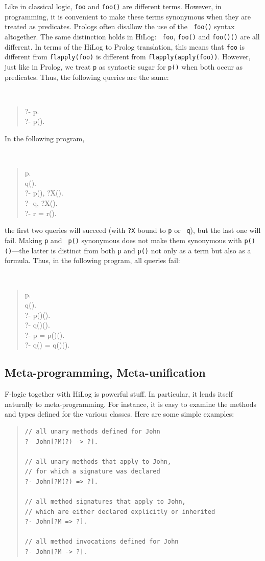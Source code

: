 \documentclass[11pt]{article}
\newcommand{\fl}{\mbox{F-logic}\xspace}
\begin{document}
%
Like in classical logic, {\tt foo} and {\tt foo()} are different terms.
However, in programming, it is convenient to make these terms synonymous
when they
are treated as predicates. Prologs often disallow the use of the {\tt
  foo()} syntax altogether.  The same distinction holds in HiLog: {\tt
  foo}, {\tt foo()} and {\tt foo()()} are all different. In terms of the
HiLog to Prolog translation, this means that {\tt foo} is different from
{\tt flapply(foo)} is different from {\tt flapply(apply(foo))}.  However, just
like in Prolog, we treat {\tt p} as syntactic sugar for {\tt p()} when both
occur as predicates. Thus, the following queries are the same:
{\tt
\begin{quote}
  ?- p.\\
  ?- p().
\end{quote}
}
\noindent
In the following program,
{\tt
\begin{quote}
 p. \\
 q().\\
 ?- p(), ?X().\\
 ?- q, ?X().\\
 ?- r = r().
\end{quote}
}
\noindent
the first two queries will succeed (with {\tt ?X} bound to {\tt p} or {\tt
  q}), but the last one will fail.  Making {\tt p} and {\tt
  p()} synonymous does not make them synonymous with {\tt p()()}---the
latter is distinct from both {\tt p}
and {\tt p()} not only as a term but also as a formula. Thus, in the following
program, all queries fail:
{\tt
\begin{quote}
 p.\\
 q().\\
 ?- p()().\\
 ?- q()().\\
 ?- p = p()().\\
 ?- q() = q()().
\end{quote}
}


\subsection{Meta-programming, Meta-unification}
\label{sec-meta-reification}


%
\fl together with HiLog is powerful stuff. In particular, it lends itself
naturally to meta-programming. For instance, it is easy to examine the
methods and types defined for the various classes.  Here are some simple
examples:
\begin{quote}
\begin{verbatim}
// all unary methods defined for John
?- John[?M(?) -> ?].

// all unary methods that apply to John,
// for which a signature was declared
?- John[?M(?) => ?].

// all method signatures that apply to John,
// which are either declared explicitly or inherited
?- John[?M => ?].

// all method invocations defined for John
?- John[?M -> ?].
\end{verbatim}
\end{quote}
\end{document}
